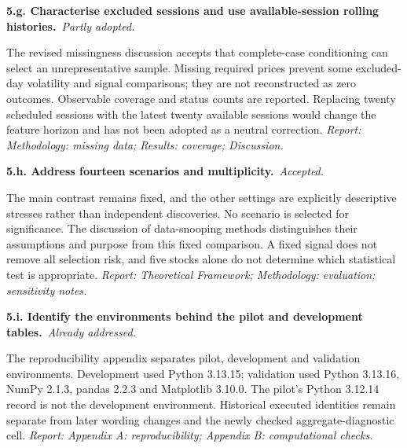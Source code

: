 \documentclass[11pt,a4paper]{article}
\newcommand{\reply}[3]{\par\addvspace{5pt}\noindent\textbf{#1. #2}\ \textit{#3.}\par\nobreak}
\begin{document}
\par\noindent\begin{minipage}{\linewidth}\justifying
\reply{5.g}{Characterise excluded sessions and use available-session rolling histories.}{Partly adopted}
The revised missingness discussion accepts that complete-case conditioning can select an unrepresentative sample. Missing required prices prevent some excluded-day volatility and signal comparisons; they are not reconstructed as zero outcomes. Observable coverage and status counts are reported. Replacing twenty scheduled sessions with the latest twenty available sessions would change the feature horizon and has not been adopted as a neutral correction.
{\small\textit{Report: Methodology: missing data; Results: coverage; Discussion.}}
\end{minipage}\par\addvspace{5pt}

\par\noindent\begin{minipage}{\linewidth}\justifying
\reply{5.h}{Address fourteen scenarios and multiplicity.}{Accepted}
The main contrast remains fixed, and the other settings are explicitly descriptive stresses rather than independent discoveries. No scenario is selected for significance. The discussion of data-snooping methods distinguishes their assumptions and purpose from this fixed comparison. A fixed signal does not remove all selection risk, and five stocks alone do not determine which statistical test is appropriate.
{\small\textit{Report: Theoretical Framework; Methodology: evaluation; sensitivity notes.}}
\end{minipage}\par\addvspace{5pt}

\par\noindent\begin{minipage}{\linewidth}\justifying
\reply{5.i}{Identify the environments behind the pilot and development tables.}{Already addressed}
The reproducibility appendix separates pilot, development and validation environments. Development used Python 3.13.15; validation used Python 3.13.16, NumPy 2.1.3, pandas 2.2.3 and Matplotlib 3.10.0. The pilot's Python 3.12.14 record is not the development environment. Historical executed identities remain separate from later wording changes and the newly checked aggregate-diagnostic cell.
{\small\textit{Report: Appendix A: reproducibility; Appendix B: computational checks.}}
\end{minipage}\par\addvspace{5pt}
\end{document}
